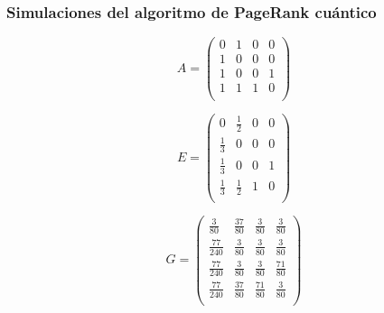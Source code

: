 \documentclass[xetex,mathserif,serif, 8pt]{beamer}
\begin{document}
\begin{frame}
    \frametitle{Simulaciones del algoritmo de PageRank cuántico}

\begin{equation}
    A =
    \begin{pmatrix}
        0 & 1 & 0 & 0 \\
        1 & 0 & 0 & 0 \\
        1 & 0 & 0 & 1 \\
        1 & 1 & 1 & 0 \\
    \end{pmatrix}
\end{equation}

\begin{equation}
    E =
    \begin{pmatrix}
        0 & \frac{1}{2} & 0 & 0 \\
        \frac{1}{3} & 0 & 0 & 0 \\
        \frac{1}{3} & 0 & 0 & 1 \\
        \frac{1}{3} & \frac{1}{2} & 1 & 0 \\
    \end{pmatrix}
\end{equation}

\begin{equation}
    G =
    \begin{pmatrix}
        \frac{3}{80} & \frac{37}{80} & \frac{3}{80} & \frac{3}{80} \\
        \frac{77}{240} & \frac{3}{80} & \frac{3}{80} & \frac{3}{80} \\
        \frac{77}{240} & \frac{3}{80} & \frac{3}{80} & \frac{71}{80} \\
        \frac{77}{240} & \frac{37}{80} & \frac{71}{80} & \frac{3}{80} \\
    \end{pmatrix}
\end{equation}

\end{frame}
\end{document}

